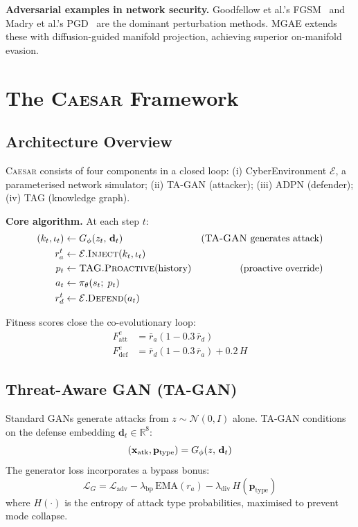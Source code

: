 \documentclass[conference]{IEEEtran}
\newcommand{\caesar}{\textsc{Caesar}}
\newcommand{\tagan}{\textsc{TA-GAN}}
\newcommand{\adpn}{\textsc{ADPN}}
\newcommand{\tagraph}{\textsc{TAG}}
\newcommand{\mgae}{\textsc{MGAE}}
\newcommand{\R}{\mathbb{R}}
\begin{document}
\textbf{Adversarial examples in network security.}
Goodfellow et al.'s FGSM~\cite{goodfellow2014b} and Madry et al.'s
PGD~\cite{madry2018} are the dominant perturbation methods.
\mgae{} extends these with diffusion-guided manifold projection,
achieving superior on-manifold evasion.

\section{The \caesar{} Framework}
\label{sec:caesar}

\subsection{Architecture Overview}

\caesar{} consists of four components in a closed loop:
(i) CyberEnvironment $\mathcal{E}$, a parameterised network simulator;
(ii) \tagan{} (attacker); (iii) \adpn{} (defender);
(iv) \tagraph{} (knowledge graph).

\textbf{Core algorithm.}
At each step $t$:
\begin{align}
  (k_t, \iota_t) &\leftarrow G_\phi(z_t,\, \mathbf{d}_t)
    &\text{(\tagan{} generates attack)}\\
  r_a^t &\leftarrow \mathcal{E}.\text{\textsc{Inject}}(k_t, \iota_t) \\
  p_t &\leftarrow \text{\tagraph.\textsc{Proactive}}(\text{history})
    &\text{(proactive override)}\\
  a_t &\leftarrow \pi_\theta(s_t;\; p_t) \\
  r_d^t &\leftarrow \mathcal{E}.\text{\textsc{Defend}}(a_t)
\end{align}

Fitness scores close the co-evolutionary loop:
\begin{align}
  F_{\mathrm{att}}^e &= \bar r_a (1 - 0.3\,\bar r_d) \label{eq:fatt}\\
  F_{\mathrm{def}}^e &= \bar r_d (1 - 0.3\,\bar r_a) + 0.2\,H \label{eq:fdef}
\end{align}

\subsection{Threat-Aware GAN (\tagan{})}
\label{sec:tagan}

Standard GANs generate attacks from $z \sim \mathcal{N}(0,I)$ alone.
\tagan{} conditions on the defense embedding $\mathbf{d}_t \in \R^8$:
\begin{equation}
  ({\bf x}_{\mathrm{atk}}, {\bf p}_{\mathrm{type}}) = G_\phi(z,\, \mathbf{d}_t)
\end{equation}
The generator loss incorporates a bypass bonus:
\begin{equation}
  \mathcal{L}_G = \mathcal{L}_{\mathrm{adv}} - \lambda_{\mathrm{bp}}\,
    \mathrm{EMA}(r_a) - \lambda_{\mathrm{div}}\,H(\mathbf{p}_{\mathrm{type}})
\end{equation}
where $H(\cdot)$ is the entropy of attack type probabilities, maximised
to prevent mode collapse.
\end{document}
